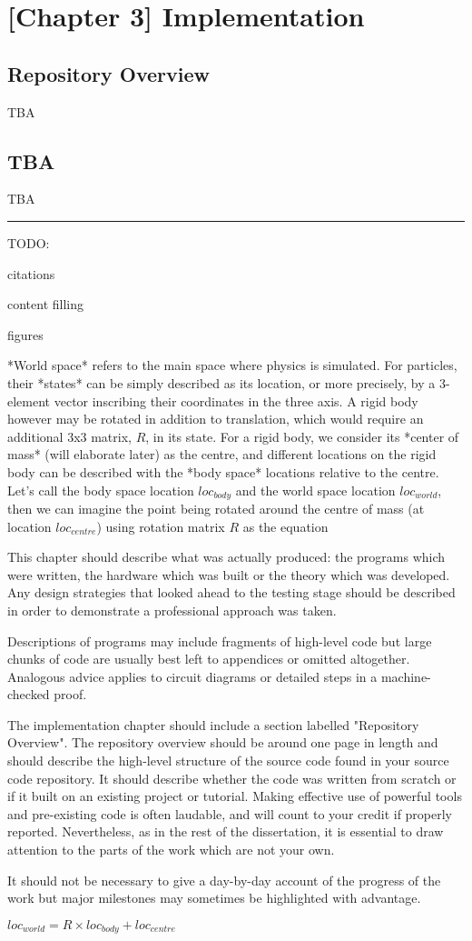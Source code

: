 \documentclass[runningheads]{llncs}
\begin{document}
\chapter{[Chapter 3] Implementation}

\section{Repository Overview}

TBA

\section{TBA}

TBA

\noindent\rule{12cm}{0.4pt}

TODO:

citations

content filling

figures

*World space* refers to the main space where physics is simulated. For particles, their *states* can be simply described as its location, or more precisely, by a 3-element vector inscribing their coordinates in the three axis. A rigid body however may be rotated in addition to translation, which would require an additional 3x3 matrix, $R$, in its state. For a rigid body, we consider its *center of mass* (will elaborate later) as the centre, and different locations on the rigid body can be described with the *body space* locations relative to the centre. Let's call the body space location $loc_{body}$ and the world space location $loc_{world}$, then we can imagine the point being rotated around the centre of mass (at location $loc_{centre}$) using rotation matrix $R$ as the equation


This chapter should describe what was actually produced: the programs which were written, the hardware which was built or the theory which was developed. Any design strategies that looked ahead to the testing stage should be described in order to demonstrate a professional approach was taken.

Descriptions of programs may include fragments of high-level code but large chunks of code are usually best left to appendices or omitted altogether. Analogous advice applies to circuit diagrams or detailed steps in a machine-checked proof.

The implementation chapter should include a section labelled "Repository Overview". The repository overview should be around one page in length and should describe the high-level structure of the source code found in your source code repository. It should describe whether the code was written from scratch or if it built on an existing project or tutorial. Making effective use of powerful tools and pre-existing code is often laudable, and will count to your credit if properly reported. Nevertheless, as in the rest of the dissertation, it is essential to draw attention to the parts of the work which are not your own. 

It should not be necessary to give a day-by-day account of the progress of the work but major milestones may sometimes be highlighted with advantage.

$loc_{world} = R \times loc_{body} + loc_{centre}$
\end{document}
